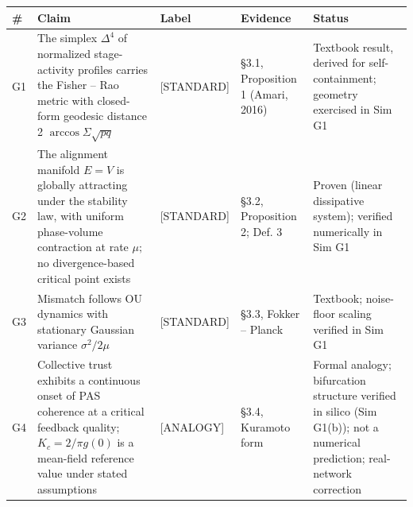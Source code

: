 \documentclass[
]{article}
\newcounter{none} %
\begin{document}
{\def\LTcaptype{none} %
\begin{longtable}[]{@{}
  >{\raggedright\arraybackslash}p{}
  >{\raggedright\arraybackslash}p{}
  >{\raggedright\arraybackslash}p{}
  >{\raggedright\arraybackslash}p{}
  >{\raggedright\arraybackslash}p{}@{}}
\toprule\noalign{}
\begin{minipage}[b]{\linewidth}\raggedright
\textbf{\#}
\end{minipage} & \begin{minipage}[b]{\linewidth}\raggedright
\textbf{Claim}
\end{minipage} & \begin{minipage}[b]{\linewidth}\raggedright
\textbf{Label}
\end{minipage} & \begin{minipage}[b]{\linewidth}\raggedright
\textbf{Evidence}
\end{minipage} & \begin{minipage}[b]{\linewidth}\raggedright
\textbf{Status}
\end{minipage} \\
\midrule\noalign{}
\endhead
\bottomrule\noalign{}
\endlastfoot
G1 & The simplex \(\Delta^{4}\) of normalized stage-activity profiles
carries the Fisher -- Rao metric with closed-form geodesic distance 2
\(\arccos \Sigma \sqrt{pq}\) & {[}STANDARD{]} & §3.1, Proposition 1
(Amari, 2016) & Textbook result, derived for self-containment; geometry
exercised in Sim G1 \\
G2 & The alignment manifold \(E = V\) is globally attracting under the
stability law, with uniform phase-volume contraction at rate \(\mu;\) no
divergence-based critical point exists & {[}STANDARD{]} & §3.2,
Proposition 2; Def. 3 & Proven (linear dissipative system); verified
numerically in Sim G1 \\
G3 & Mismatch follows OU dynamics with stationary Gaussian variance
\(\sigma^{2}/2\mu\) & {[}STANDARD{]} & §3.3, Fokker -- Planck &
Textbook; noise-floor scaling verified in Sim G1 \\
G4 & Collective trust exhibits a continuous onset of PAS coherence at a
critical feedback quality; \(K_c = 2/\pi g(0)\) is a mean-field
reference value under stated assumptions & {[}ANALOGY{]} & §3.4,
Kuramoto form & Formal analogy; bifurcation structure verified in silico
(Sim G1(b)); not a numerical prediction; real-network correction

\end{longtable}}
\end{document}
